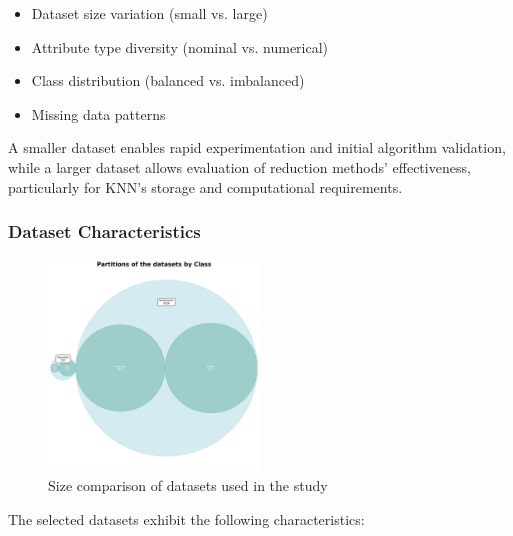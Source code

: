 \begin{itemize}
    \item Dataset size variation (small vs. large)
    \item Attribute type diversity (nominal vs. numerical)
    \item Class distribution (balanced vs. imbalanced)
    \item Missing data patterns
\end{itemize}

A smaller dataset enables rapid experimentation and initial algorithm validation, while a larger dataset allows evaluation of reduction methods' effectiveness, particularly for KNN's storage and computational requirements.

\subsubsection{Dataset Characteristics}

\begin{figure}
    \centering
    \includegraphics[width=0.5\textwidth]{figures/dataset-partitions.png}
    \caption{Size comparison of datasets used in the study}
    \label{fig:dataset-partitions}
\end{figure}

The selected datasets exhibit the following characteristics:

